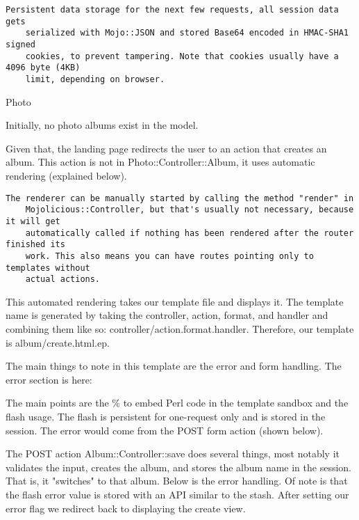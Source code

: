 \documentclass[14pt]{extreport}
\begin{document}
\begin{lstlisting}[style=BlockStyle]
    Persistent data storage for the next few requests, all session data gets
    serialized with Mojo::JSON and stored Base64 encoded in HMAC-SHA1 signed
    cookies, to prevent tampering. Note that cookies usually have a 4096 byte (4KB)
    limit, depending on browser.
\end{lstlisting}

{\Large Photo}

Initially, no photo albums exist in the model.

Given that, the landing page redirects the user to an action that creates an
album.  This action is not in Photo::Controller::Album, it uses automatic
rendering (explained below).

\begin{lstlisting}[style=BlockStyle]
    The renderer can be manually started by calling the method "render" in
    Mojolicious::Controller, but that's usually not necessary, because it will get
    automatically called if nothing has been rendered after the router finished its
    work. This also means you can have routes pointing only to templates without
    actual actions.
\end{lstlisting}

This automated rendering takes our template file and displays it.  The template
name is generated by taking the controller, action, format, and handler and
combining them like so: controller/action.format.handler.  Therefore, our
template is album/create.html.ep.

The main things to note in this template are the error and form handling.  The
error section is here:



The main points are the \% to embed Perl code in the template sandbox and the
flash usage.  The flash is persistent for one-request only and is stored in the
session.  The error would come from the POST form action (shown below).



The POST action Album::Controller::save does several things, most notably it
validates the input, creates the album, and stores the album name in the session. 
That is, it "switches" to that album. Below is the error handling.  Of note is that
the flash error value is stored with an API similar to the stash.  After setting our
error flag we redirect back to displaying the create view.
\end{document}
